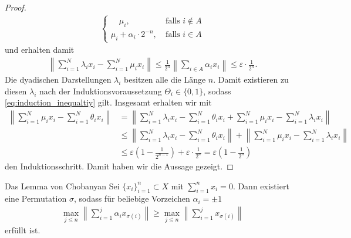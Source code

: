 \begin{proof}
\begin{align*}
		\begin{cases}
			\quad \mu_i, \ &\textrm{falls } i \notin A\\
			\mu_i + \alpha_i \cdot  2^{-n}, \ &\textrm{falls } i \in A
		\end{cases}
	\end{align*}
	und erhalten damit
	\begin{align*}
		\left\|
		\sum \limits_{i = 1 }^N
		\lambda_{i} x_i 
		- \sum \limits_{i =1 }^N
		\mu_i x_i
		\right\| 
		\leq 
		\frac{1}{2^n}
		\left\| \sum \limits_{i \in A} \alpha_i x_i \right\|
		\leq
		\varepsilon \cdot \frac{1}{2^n}.
	\end{align*}
	Die dyadischen Darstellungen $ \lambda_i $ besitzen alle die Länge $ n $.
	Damit existieren zu diesen $ \lambda_{i} $ nach der Induktionsvoraussetzung
	$ \Theta_i \in  \{0, 1\}  $, sodass \eqref{eq:induction_inequaltiy} gilt.
	Insgesamt erhalten wir mit
	\begin{align*}
		\left\|
		\sum \limits_{i = 1}^N
		\mu_i x_i
		-
		\sum \limits_{i = 1}^N
		\theta_i x_i
		\right\|
		&=
		\left\|
		\sum \limits_{i = 1}^N
		\lambda_i x_i
		-
		\sum \limits_{i = 1}^N
		\theta_i x_i
		+
		\sum \limits_{i = 1}^N
		\mu_i x_i
		-
		\sum \limits_{i = 1}^N
		\lambda_i x_i
		\right\|\\
		&\leq
		\left\|
		\sum \limits_{i = 1}^N
		\lambda_i x_i
		-
		\sum \limits_{i = 1}^N
		\theta_i x_i
		\right\|
		+
		\left\|
		\sum \limits_{i = 1}^N
		\mu_i x_i
		-
		\sum \limits_{i = 1}^N
		\lambda_i x_i
		\right\|\\
		&\leq 
		\varepsilon
		\left(1 - \frac{1}{2^{n-1}}\right)
		+ \varepsilon \cdot  \frac{1}{2^n }
		=
		\varepsilon \left(
		1 - \frac{1}{2^n}
		\right)
	\end{align*}
	den Induktionsschritt.
	Damit haben wir die Aussage gezeigt.
	
\end{proof}


\begin{genericthm}{Das Lemma von Chobanyan}\label{th:lemma_chobanyan}
	Sei $ \{x_i\}_{i = 1}^n \subset X $ mit $ \sum_{i  = 1 }^n  x_i = 0$.
	Dann existiert eine Permutation $ \sigma $, sodass für beliebige Vorzeichen $ \alpha_i = \pm 1 $
	\begin{align}\label{eq:lem_choban_ineq}
		\max \limits_{j \leq n}
		\left\|
		\sum \limits_{i = 1}^j \alpha_i x_{\sigma(i)}
		\right\|
		\geq 
		\max \limits_{j \leq n}
		\left\|
		\sum \limits_{i = 1}^j  x_{\sigma(i)}
		\right\|
	\end{align}
	erfüllt ist.
\end{genericthm}


